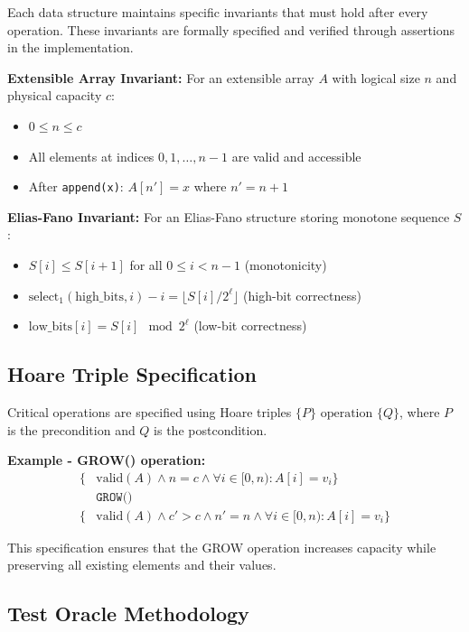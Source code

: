 Each data structure maintains specific invariants that must hold after every operation. These invariants are formally specified and verified through assertions in the implementation.

\textbf{Extensible Array Invariant:} For an extensible array $A$ with logical size $n$ and physical capacity $c$:
\begin{itemize}
    \item $0 \leq n \leq c$
    \item All elements at indices $0, 1, \ldots, n-1$ are valid and accessible
    \item After \texttt{append(x)}: $A[n'] = x$ where $n' = n + 1$
\end{itemize}

\textbf{Elias-Fano Invariant:} For an Elias-Fano structure storing monotone sequence $S$:
\begin{itemize}
    \item $S[i] \leq S[i+1]$ for all $0 \leq i < n-1$ (monotonicity)
    \item $\text{select}_1(\text{high\_bits}, i) - i = \lfloor S[i] / 2^\ell \rfloor$ (high-bit correctness)
    \item $\text{low\_bits}[i] = S[i] \mod 2^\ell$ (low-bit correctness)
\end{itemize}

\subsection{Hoare Triple Specification}

Critical operations are specified using Hoare triples $\{P\} \text{ operation } \{Q\}$, where $P$ is the precondition and $Q$ is the postcondition.

\textbf{Example - GROW() operation:}
\begin{align*}
    \{&\text{valid}(A) \land n = c \land \forall i \in [0, n): A[i] = v_i\} \\
    &\texttt{GROW()} \\
    \{&\text{valid}(A) \land c' > c \land n' = n \land \forall i \in [0, n): A[i] = v_i\}
\end{align*}

This specification ensures that the GROW operation increases capacity while preserving all existing elements and their values.

\subsection{Test Oracle Methodology}

